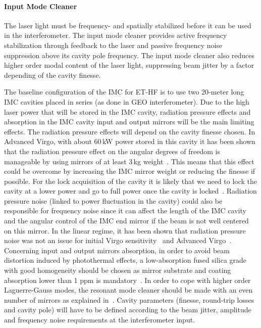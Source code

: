 \paragraph{Input Mode Cleaner}

The laser light must be frequency- and spatially stabilized before it can be used in the interferometer.
 The input mode cleaner  provides active frequency stabilization through feedback to the laser and passive
frequency noise suppression above its cavity pole frequency. %
The input mode cleaner also reduces higher order modal content of the laser light, suppressing beam jitter by a
factor depending of the cavity finesse.


The baseline configuration of the IMC for ET-HF is to use two 20-meter
long IMC cavities placed in series (as done in GEO interferometer).
Due to the high laser power that will be stored in the IMC cavity,
radiation pressure effects and absorption in the  IMC cavity
input and output mirrors will be the main limiting effects. The radiation pressure effects
 will depend on the cavity
finesse chosen. In Advanced Virgo, with about 60\,kW power stored in this
cavity it has been shown that the radiation pressure effect on the angular
degrees of freedom is manageable by using mirrors of at least 3\,kg weight~\cite{RPnote}.
This means that this effect could be overcome by increasing the IMC
mirror weight or reducing the finesse if possible. For
the lock acquisition of the cavity it is likely that we need to lock the
cavity at a lower power and go to full power once the
cavity is locked~\cite{RPnote}. Radiation pressure noise (linked to
power fluctuation in the cavity) could also be responsible
for frequency noise since it can affect the length of the IMC cavity
and the angular control of the IMC end mirror if the beam
 is not well centered on this mirror. In the linear regime, it has been
 shown that radiation pressure noise was not an issue for
initial Virgo sensitivity~\cite{RPnoise} and Advanced Virgo~\cite{INJPDS}.
Concerning input and output mirrors absorption, in order to
avoid beam distortion induced by photothermal effects, a low-absorption
fused silica grade with good homogeneity should be
chosen as mirror substrate and coating absorption lower than 1
ppm is mandatory~\cite{IMCcharac}.
In order to cope with higher order Laguerre-Gauss modes,
the resonant mode cleaner should be made with an even number
of mirrors as explained in~\cite{barsu,chelkow}.
Cavity parameters (finesse, round-trip losses and cavity pole)
will have to be defined according to the beam jitter, amplitude
and frequency noise requirements at the interferometer input.

